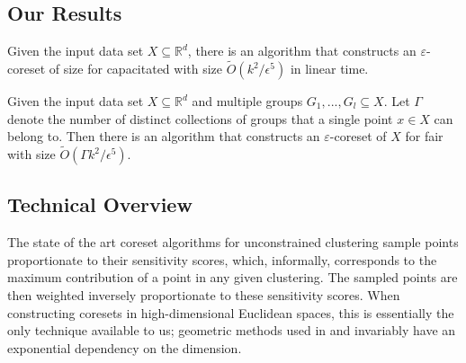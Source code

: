 




\subsection{Our Results}

\begin{theorem} Given the input data set $X\subseteq\mathbb{R}^d$, there is an algorithm that constructs an $\varepsilon$-coreset of size for capacitated \kMedian with size $\tilde{O}(k^2/\epsilon^5)$ in linear time.
\end{theorem}

\begin{theorem} Given the input data set $X\subseteq \mathbb{R}^d$ and multiple groups $G_1,...,G_l\subseteq X$. Let $\Gamma$ denote the number of distinct collections of groups that a single point $x\in X$ can belong to. Then there is an algorithm that constructs an $\varepsilon$-coreset of $X$ for fair \kMedian with size $\tilde{O}(\Gamma k^2/\epsilon^5)$.

\end{theorem}

\subsection{Technical Overview} \label{sec:tech}
The state of the art coreset algorithms for unconstrained clustering sample points proportionate to their sensitivity scores, which, informally, corresponds to the maximum contribution of a point in any given clustering. 
The sampled points are then weighted inversely proportionate to these sensitivity scores.
When constructing coresets in high-dimensional Euclidean spaces, this is essentially the only technique available to us; geometric methods used in \cite{HuangJV19} and \cite{SSS19} invariably have an exponential dependency on the dimension.

